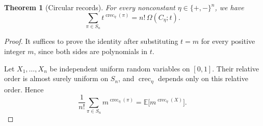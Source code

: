 \documentclass[11pt,letterpaper,reqno]{amsart}
\newtheorem{theorem}{Theorem}[section]
\theoremstyle{definition}
\begin{document}
\begin{theorem}[Circular records]\label{thm:circular-records}
For every nonconstant \(\eta\in\{+,-\}^n\), we have
\[
\sum_{\pi\in S_n}t^{\operatorname{crec}_\eta(\pi)}
=
n!\,\Omega(C_\eta;t).
\]
\end{theorem}

\begin{proof}
It suffices to prove the identity after substituting \(t=m\) for every positive
integer \(m\), since both sides are polynomials in \(t\).

Let \(X_1,\ldots,X_n\) be independent uniform random variables on \([0,1]\).
Their relative order is almost surely uniform on \(S_n\), and
\(\operatorname{crec}_\eta\) depends only on this relative order.  Hence
\[
\frac1{n!}\sum_{\pi\in S_n}m^{\operatorname{crec}_\eta(\pi)}
=
\mathbb E\bigl[m^{\operatorname{crec}_\eta(X)}\bigr].
\]


\end{proof}
\end{document}
